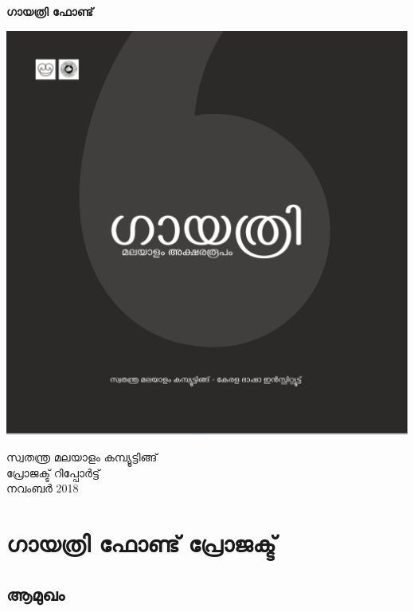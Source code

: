 \documentclass[12pt]{article}
\begin{document}
	
\begin{titlepage}
	\begin{center}
		\Huge{{\textbf{ഗായത്രി ഫോണ്ട്}}}\\[0.5cm]
		\begin{centering}
		\includegraphics[width=\textwidth]{title.png}\\[0.5cm]	
		\end
		{centering}
		

		\textsc{\Large {സ്വതന്ത്ര മലയാളം കമ്പ്യൂട്ടിങ്ങ്}}~\\
		

		{\textsc{\Large {പ്രോജക്ട് റിപ്പോര്‍ട്ട്}}}\\
		നവംബര്‍ 2018
	\end{center}
\end{titlepage}
 

	
	
	
	\section{ഗായത്രി ഫോണ്ട് പ്രോജക്ട്}
	
	
	\subsection{ആമുഖം}
	
\end{document}
